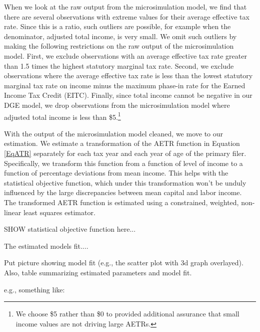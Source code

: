 \documentclass[letterpaper,12pt]{article}
\theoremstyle{definition}
\begin{document}
\begin{spacing}{1.5}
When we look at the raw output from the microsimulation model, we find that there are several observations with extreme values for their average effective tax rate.  Since this is a ratio, such outliers are possible, for example when the denominator, adjusted total income, is very small.  We omit such outliers by making the following restrictions on the raw output of the microsimulation model.  First, we exclude observations with an average effective tax rate greater than 1.5 times the highest statutory marginal tax rate.  Second, we exclude observations where the average effective tax rate is less than the lowest statutory marginal tax rate on income minus the maximum phase-in rate for the Earned Income Tax Credit (EITC).  Finally, since total income cannot be negative in our DGE model, we drop observations from the microsimulation model where adjusted total income is less than \$5.\footnote{We choose \$5 rather than \$0 to provided additional assurance that small income values are not driving large AETRs.} 

With the output of the microsimulation model cleaned, we move to our estimation.  We estimate a transformation of the AETR function in Equation \ref{EqATR} separately for each tax year and each year of age of the primary filer.  Specifically, we transform this function from a function of level of income to a function of percentage deviations from mean income.  This helps with the statistical objective function, which under this transformation won't be unduly influenced by the large discrepancies between mean capital and labor income.  The transformed AETR function is estimated using a constrained, weighted, non-linear least squares estimator.  

SHOW statistical objective function here...

The estimated models fit....

Put picture showing model fit (e.g., the scatter plot with 3d graph overlayed).  Also, table summarizing estimated parameters and model fit.





e.g., something like:


\end{spacing}
\end{document}
